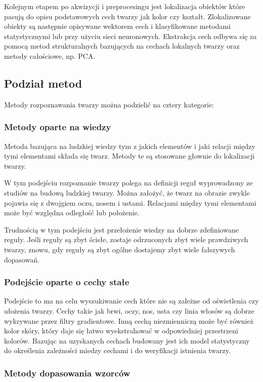 \documentclass[11pt,a4paper]{article}
\begin{document}
Kolejnym etapem po akwizycji i preprocesingu jest lokalizacja obiektów które pasują do opisu podstawowych cech twarzy jak kolor czy kształt. Zlokalizowane obiekty są następnie opisywane wektorem cech i klasyfikowane metodami statystycznymi lub przy użyciu sieci neuronowych. Ekstrakcja cech odbywa się za pomocą metod strukturalnych bazujących na cechach lokalnych twarzy oraz metody całościowe, np. PCA.

\subsection{Podział metod}

Metody rozpoznawania twarzy można podzielić na cztery kategorie\cite{YANG001}:

\subsubsection{Metody oparte na wiedzy}

Metoda bazująca na ludzkiej wiedzy tym z jakich elementów i jaki relacji między tymi elementami składa się twarz. Metody te są stosowane głownie do lokalizacji twarzy.

W tym podejściu rozpoznanie twarzy polega na definicji reguł wyprowadzony ze studiów na budową ludzkiej twarzy. Można założyć, że twarz na obrazie zwykle pojawia się z dwojgiem oczu, nosem i ustami. Relacjami między tymi elementami może być względna odległość lub położenie.

Trudnością w tym podejściu jest przełożenie wiedzy na dobrze zdefiniowane reguły. Jeśli reguły są zbyt ścisłe, zostaje odrzuconych zbyt wiele prawdziwych twarzy, znowu, gdy reguły są zbyt ogólne dostajemy zbyt wiele fałszywych dopasowań.

\subsubsection{Podejście oparte o cechy stałe}

Podejście to ma na celu wyszukiwanie cech które nie są zależne od oświetlenia czy ułożenia twarzy. Cechy takie jak brwi, oczy, nos, usta czy linia włosów są dobrze wykrywane przez filtry gradientowe. Inną cechą niezmienniczą może być również kolor skóry, który daje się łatwo wyekstrahować w odpowiedniej przestrzeni kolorów. Bazując na uzyskanych cechach budowany jest ich model statystyczny do określenia zależności miedzy cechami i do weryfikacji istnienia twarzy.

\subsubsection{Metody dopasowania wzorców}
\end{document}
